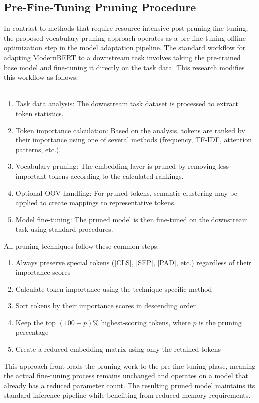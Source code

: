 \documentclass[twocolumn]{article}
\begin{document}
\subsection{Pre-Fine-Tuning Pruning Procedure}
In contrast to methods that require resource-intensive post-pruning fine-tuning, the proposed vocabulary pruning approach operates as a pre-fine-tuning offline optimization step in the model adaptation pipeline. The standard workflow for adapting ModernBERT to a downstream task involves taking the pre-trained base model and fine-tuning it directly on the task data. This research modifies this workflow as follows:
\\ \\
\begin{enumerate}
    \item Task data analysis: The downstream task dataset is processed to extract token statistics.
    \item Token importance calculation: Based on the analysis, tokens are ranked by their importance using one of several methods (frequency, TF-IDF, attention patterns, etc.).
    \item Vocabulary pruning: The embedding layer is pruned by removing less important tokens according to the calculated rankings.
    \item Optional OOV handling: For pruned tokens, semantic clustering may be applied to create mappings to representative tokens.
    \item Model fine-tuning: The pruned model is then fine-tuned on the downstream task using standard procedures.
\end{enumerate}
All pruning techniques follow these common steps:
\begin{enumerate}
    \item Always preserve special tokens ([CLS], [SEP], [PAD], etc.) regardless of their importance scores
    \item Calculate token importance using the technique-specific method
    \item Sort tokens by their importance scores in descending order
    \item Keep the top $(100-p)\%$ highest-scoring tokens, where $p$ is the pruning percentage
    \item Create a reduced embedding matrix using only the retained tokens
\end{enumerate}
This approach front-loads the pruning work to the pre-fine-tuning phase, meaning the actual fine-tuning process remains unchanged and operates on a model that already has a reduced parameter count. The resulting pruned model maintains its standard inference pipeline while benefiting from reduced memory requirements.
\end{document}
